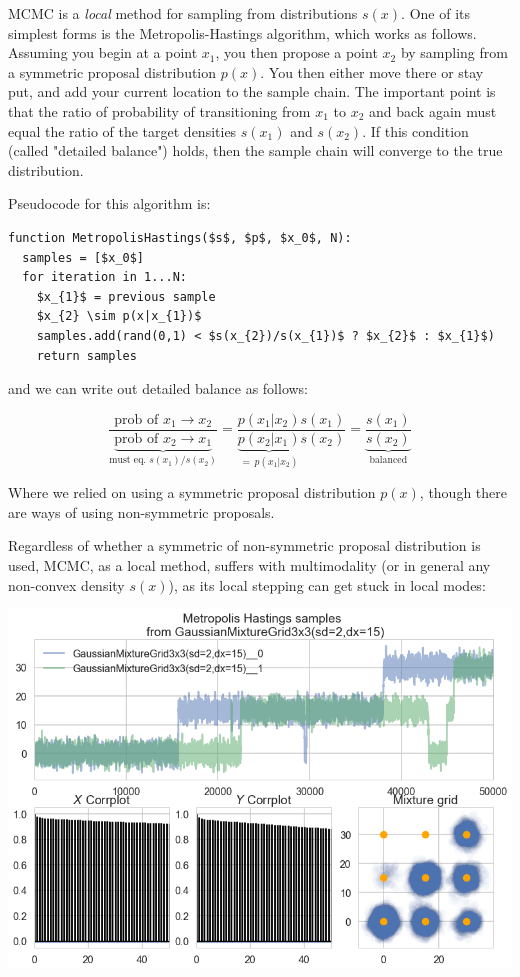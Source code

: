 \documentclass{article}
\begin{document}
MCMC is a \textit{local} method for sampling from distributions $s(x)$. One of its
simplest forms is the Metropolis-Hastings algorithm, which works as follows.
Assuming you begin at a point $x_1$, you then propose a point $x_2$ by
sampling from a symmetric proposal distribution $p(x)$. You then either
move there or stay put, and add your current location to the sample chain. The
important point is that the ratio of probability of transitioning from
$x_1$ to $x_2$ and back again must equal the ratio of the target
densities $s(x_1)$ and $s(x_2)$. If this condition (called "detailed
balance") holds, then the sample chain will converge to the true distribution.

Pseudocode for this algorithm is: 

\begin{lstlisting}[mathescape=true]
function MetropolisHastings($s$, $p$, $x_0$, N):
  samples = [$x_0$]
  for iteration in 1...N:
    $x_{1}$ = previous sample
    $x_{2} \sim p(x|x_{1})$
    samples.add(rand(0,1) < $s(x_{2})/s(x_{1})$ ? $x_{2}$ : $x_{1}$)
    return samples
\end{lstlisting}

and we can write out detailed balance as follows:

$$ \frac{\text{prob of }x_1\to x_2}{\underbrace{\text{prob of }x_2\to
x_1}_{\text{must eq. $s(x_1)/s(x_2)$}}} =
\frac{p(x_1|x_2)s(x_1)}{\underbrace{p(x_2|x_1)}_{=\, p(x_1|x_2)}s(x_2)} =
\underbrace{\frac{s(x_1)}{s(x_2)}}_{\text{balanced}} $$

Where we relied on using a symmetric proposal distribution $p(x)$, though
there are ways of using non-symmetric proposals.

Regardless of whether a symmetric of non-symmetric proposal distribution is
used, MCMC, as a local method, suffers with multimodality (or in general any
non-convex density $s(x)$), as its local stepping can get stuck in local
modes:

\includegraphics[width=\textwidth]{mh-trace.png}
\end{document}
